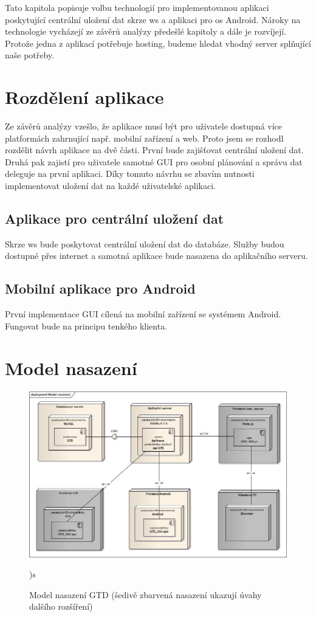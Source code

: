 \documentclass[thesis=B,czech]{FITthesis}[2012/06/26]
\begin{document}
Tato kapitola popisuje volbu technologií pro implementovanou aplikaci poskytující centrální uložení dat skrze \acrshort{ws} a aplikaci pro \acrshort{os} Android. Nároky na technologie vycházejí ze závěrů analýzy předešlé kapitoly a dále je rozvíjejí.
Protože jedna z aplikací potřebuje hosting, budeme hledat vhodný server splňující naše potřeby.

\section{Rozdělení aplikace}

Ze závěrů analýzy vzešlo, že aplikace musí být pro uživatele dostupná více platformách zahrnující např. mobilní zařízení a web. Proto jsem se rozhodl rozdělit návrh aplikace na dvě části. První bude zajišťovat centrální uložení dat. Druhá pak zajistí pro uživatele samotné GUI pro osobní plánování a správu dat deleguje na první aplikaci. Díky tomuto návrhu se zbavím nutnosti implementovat uložení dat na každé uživatelské aplikaci.

\subsection{Aplikace pro centrální uložení dat}

Skrze \acrshort{ws} bude poskytovat centrální uložení dat do databáze. Služby budou dostupné přes internet a samotná aplikace bude nasazena do aplikačního serveru.

\subsection{Mobilní aplikace pro Android}

První implementace GUI cílená na mobilní zařízení se systémem Android. Fungovat bude na  principu tenkého klienta\cite{gtd_thin_client}.

\section{Model nasazení}

\begin{figure}[h!]\centering
	\includegraphics[width=1\textwidth]{pictures/gtd_deployment_model}
	\caption{Model nasazení GTD (šedivě zbarvená nasazení ukazují úvahy dalšího rozšíření)})\label{fig:gtd_deployment_model}s
\end{figure}
\end{document}
